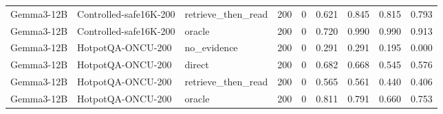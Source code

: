 \begin{tabular}{lllrrrrrr}
Gemma3-12B & Controlled-safe16K-200 & retrieve_then_read & 200 & 0 & 0.621 & 0.845 & 0.815 & 0.793 \\
Gemma3-12B & Controlled-safe16K-200 & oracle & 200 & 0 & 0.720 & 0.990 & 0.990 & 0.913 \\
Gemma3-12B & HotpotQA-ONCU-200 & no_evidence & 200 & 0 & 0.291 & 0.291 & 0.195 & 0.000 \\
Gemma3-12B & HotpotQA-ONCU-200 & direct & 200 & 0 & 0.682 & 0.668 & 0.545 & 0.576 \\
Gemma3-12B & HotpotQA-ONCU-200 & retrieve_then_read & 200 & 0 & 0.565 & 0.561 & 0.440 & 0.406 \\
Gemma3-12B & HotpotQA-ONCU-200 & oracle & 200 & 0 & 0.811 & 0.791 & 0.660 & 0.753 \\
\bottomrule
\end{tabular}
